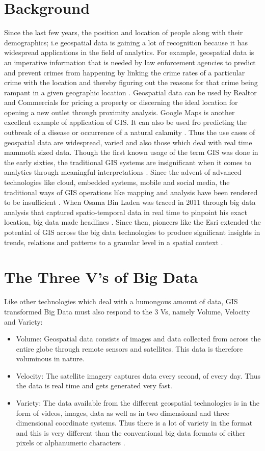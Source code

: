 \section{Background}
Since the last few years, the position and location of people along with their demographics; i.e geospatial data is gaining a lot of recognition because it has widespread applications in the field of analytics. For example, geospatial data is an imperative information that is needed by law enforcement agencies to predict and prevent crimes from happening by linking the crime rates of a particular crime with the location and thereby figuring out the reasons for that crime being rampant in a given geographic location \cite{link4}. Geospatial data can be used by Realtor and Commercials for pricing a property or discerning the ideal location for opening a new outlet through proximity analysis\cite{link5}. Google Maps is another excellent example of application of GIS. It can also be used fro predicting the outbreak of a disease or occurrence of a natural calamity \cite{link5}. Thus the use cases of geospatial data are widespread, varied and also those which deal with real time mammoth sized data. 
Though the first known usage of the term GIS was done in the early sixties, the traditional GIS systems are insignificant when it comes to analytics through meaningful interpretations \cite{link13}. Since the advent of advanced technologies like cloud, embedded systems, mobile and social media, the traditional ways of GIS operations like mapping and analysis have been rendered to be insufficient \cite{link5}.
When Osama Bin Laden was traced in 2011 through big data analysis that captured spatio-temporal data in real time to pinpoint his exact location, big data made headlines \cite{link10}. Since then, pioneers like the Esri extended the potential of GIS across the big data technologies to produce significant insights in trends, relations and patterns to a granular level in a spatial context \cite{link5}.

\section{The Three V's of Big Data}
Like other technologies which deal with a humongous amount of data, GIS transformed Big Data must also respond to the 3 Vs, namely Volume, Velocity and Variety:
\begin{itemize}
    \item Volume: Geospatial data consists of images and data collected from across the entire globe through remote sensors and satellites. This data is therefore voluminous in nature.
    \item Velocity: The satellite imagery captures data every second, of every day. Thus the data is real time and gets generated very fast.
    \item Variety: The data available from the different geospatial technologies is in the form of videos, images, data as well as in two dimensional and three dimensional coordinate systems. Thus there is a lot of variety in the format and this is very different than the conventional big data formats of either pixels or alphanumeric characters \cite{link9}.
\end{itemize}

